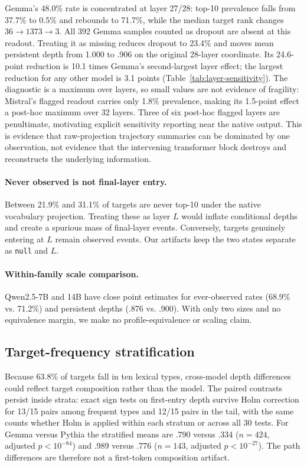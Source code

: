 \documentclass[11pt]{article}
\begin{document}
Gemma's 48.0\% rate is concentrated at layer 27/28: top-10 prevalence falls from 37.7\% to 0.5\% and rebounds to 71.7\%, while the median target rank changes $36\!\rightarrow\!1373\!\rightarrow\!3$. All 392 Gemma samples counted as dropout are absent at this readout. Treating it as missing reduces dropout to 23.4\% and moves mean persistent depth from 1.000 to .906 on the original 28-layer coordinate. Its 24.6-point reduction is 10.1 times Gemma's second-largest layer effect; the largest reduction for any other model is 3.1 points (Table~\ref{tab:layer-sensitivity}). The diagnostic is a maximum over layers, so small values are not evidence of fragility: Mistral's flagged readout carries only 1.8\% prevalence, making its 1.5-point effect a post-hoc maximum over 32 layers. Three of six post-hoc flagged layers are penultimate, motivating explicit sensitivity reporting near the native output. This is evidence that raw-projection trajectory summaries can be dominated by one observation, not evidence that the intervening transformer block destroys and reconstructs the underlying information.

\paragraph{Never observed is not final-layer entry.}
Between 21.9\% and 31.1\% of targets are never top-10 under the native vocabulary projection. Treating these as layer $L$ would inflate conditional depths and create a spurious mass of final-layer events. Conversely, targets genuinely entering at $L$ remain observed events. Our artifacts keep the two states separate as \texttt{null} and $L$.

\paragraph{Within-family scale comparison.}
Qwen2.5-7B and 14B have close point estimates for ever-observed rates (68.9\% vs. 71.2\%) and persistent depths (.876 vs. .900). With only two sizes and no equivalence margin, we make no profile-equivalence or scaling claim.

\subsection{Target-frequency stratification}
\label{sec:frequency-strata}
Because 63.8\% of targets fall in ten lexical types, cross-model depth differences could reflect target composition rather than the model. The paired contrasts persist inside strata: exact sign tests on first-entry depth survive Holm correction for 13/15 pairs among frequent types and 12/15 pairs in the tail, with the same counts whether Holm is applied within each stratum or across all 30 tests. For Gemma versus Pythia the stratified means are .790 versus .334 ($n{=}424$, adjusted $p<10^{-84}$) and .989 versus .776 ($n{=}143$, adjusted $p<10^{-27}$). The path differences are therefore not a first-token composition artifact.
\end{document}
